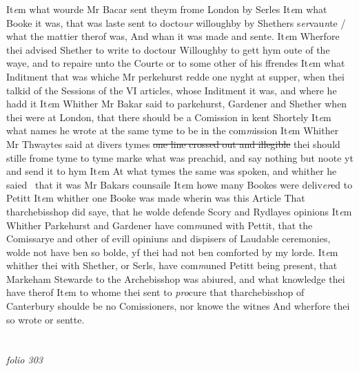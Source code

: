 \documentclass[12pt, a4paper]{book}
\begin{document}
It\textit{e}m what wourde Mr Bacar sent theym frome London by Serles It\textit{e}m what Booke it was, that was laste sent to docto\textit{ur }willoughby by Shethers s\textit{er}vau\textit{n}te / what the mattier therof was, And whan it  was made and sente.  It\textit{e}m Wherfore thei advised Shether to write to doctour Willoughby to gett hym oute of the waye, and to repaire unto the Courte or to some other of his ffrendes It\textit{e}m what Inditment that was whiche Mr perkehurst redde one nyght at supper, when thei talkid of the Sessions of the  VI articles, whose Inditment it was, and where he hadd it It\textit{e}m Whither Mr Bakar said to parkehurst, Gardener and Shether when thei were at London, that there should be a Comission in kent Shortely It\textit{e}m what names he wrote at the same tyme to be in the com\textit{m}ission It\textit{e}m Whither Mr Thwaytes said at divers tymes \sout{one line crossed out and illegible} thei should stille frome tyme to tyme marke what was preachid, and say nothing but noote yt and send it to hym It\textit{e}m At what tymes the same was spoken, and whither he saied  that it was Mr Bakars counsaile It\textit{e}m howe many Bookes were deliv\textit{er}ed to Petitt It\textit{e}m whither one Booke was made wherin was this Article That tharchebisshop did saye, that he wolde defende Scory and Rydlayes opinions It\textit{e}m Whither Parkehurst and Gardener have com\textit{m}uned with Pettit, that the Comissarye and other of evill opiniuns and dispisers of Laudable ceremonies, wolde not have ben so bolde, yf thei had not ben comforted by my lorde. It\textit{e}m whither thei with Shether, or Serls, have com\textit{m}uned Petitt being present, that Markeham Stewarde to the  Archebisshop was abiured, and what knowledge thei have therof It\textit{e}m to whome thei sent to \textit{pro}cure that tharchebisshop of Canterbury shoulde be no Comissioners, nor knowe the witnes And wherfore thei so wrote or sentte. 

\dotfill
					  \section*{}  \subsection*{}

\textit{folio 303}
\end{document}
